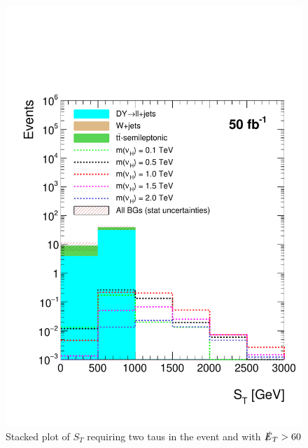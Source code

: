 \begin{figure}[H]
\centering
\includegraphics[width=\linewidth]{StackPlots/ST_2Taus_met60_50ifb_2moreSignals.pdf}
\caption{Stacked plot of $S_{T}$ requiring two taus in the event and with $\slashed{E}_{T} > 60$}
\label{fig: ST2tausMet60}
\end{figure}



